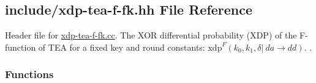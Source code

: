 \hypertarget{xdp-tea-f-fk_8hh}{\subsection{include/xdp-\/tea-\/f-\/fk.hh \-File \-Reference}
\label{xdp-tea-f-fk_8hh}
}


\-Header file for \hyperlink{xdp-tea-f-fk_8cc}{xdp-\/tea-\/f-\/fk.\-cc}. \-The \-X\-O\-R differential probability (\-X\-D\-P) of the \-F-\/function of \-T\-E\-A for a fixed key and round constants\-: $\mathrm{xdp}^{F}(k_0, k_1, \delta |~ da \rightarrow dd)$. .  


\subsubsection*{\-Functions}
